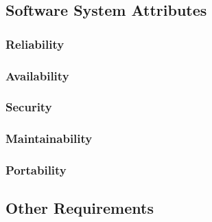 \documentclass[a4paper,11pt]{report} %
\begin{document}
	\subsection{Software System Attributes}
	
	\subsubsection{Reliability}
	
	\subsubsection{Availability}
	
	\subsubsection{Security}
	
	\subsubsection{Maintainability}

	\subsubsection{Portability}
	
	\subsection{Other Requirements}
	
	
\end{document}
